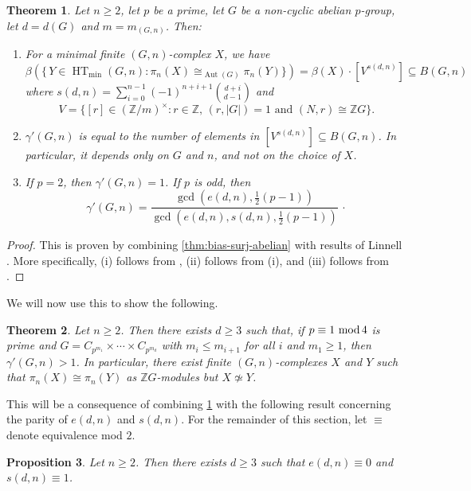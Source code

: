 \documentclass[11pt,a4paper,leqno]{amsart}
\newtheorem{theorem}{Theorem}[section]
\newtheorem{proposition}[theorem]{Proposition}
\theoremstyle{definition}
\theoremstyle{remark}
\newenvironment{clist}[1]
{\begin{enumerate}[\normalfont #1]}
{\end{enumerate}}
\newcommand{\Z}{\mathbb{Z}}
\renewcommand{\mod}{\,\,\text{\normalfont mod}\,}
\DeclareMathOperator{\Aut}{Aut}
\DeclareMathOperator{\HT}{HT}
\begin{document}
\begin{theorem} \label{thm:gamma'}
Let $n \ge 2$, let $p$ be a prime, let $G$ be a non-cyclic abelian $p$-group, let $d = d(G)$ and $m = m_{(G,n)}$. Then:
\begin{clist}{(i)}
\item
 For a minimal finite $(G,n)$-complex $X$, we have
\[ \beta(\{\, Y \in \HT_{\min}(G,n) : \pi_n(X) \cong_{\Aut(G)} \pi_n(Y)\}) = \beta(X) \cdot [V^{s(d,n)}] \subseteq B(G,n) \]
where $s(d,n) = \sum_{i=0}^{n-1} (-1)^{n+i+1}\binom{d+i}{d-1}$ and
\[ V = \{ [r] \in (\Z/m)^\times : r \in \Z, \, (r,|G|)=1 \text{ and } (N,r) \cong \Z G \}. \]
\item
$\gamma'(G,n)$ is equal to the number of elements in $[V^{s(d,n)}] \subseteq B(G,n)$. In particular, it depends only on $G$ and $n$, and not on the choice of $X$.
\item If $p =2$, then $\gamma'(G,n) = 1$. If $p$ is odd, then
\[ 
\gamma'(G,n) = \frac{\gcd(e(d,n),\frac{1}{2}(p-1))}{\gcd(e(d,n),s(d,n),\frac{1}{2}(p-1))} \,\cdot
\]
\end{clist}
\end{theorem}

\begin{proof}
This is proven by combining \cref{thm:bias-surj-abelian} with results of Linnell \cite{Linnell:1993}. More specifically, (i) follows from \cite[Theorem 8.4 (iii)]{Linnell:1993}, (ii) follows from (i), and (iii) follows from \cite[Theorems 1.2 (4)]{Linnell:1993}.
\end{proof}

We will now use this to show the following.

\begin{theorem} \label{thm:e-s-ex}
Let $n \ge 2$. Then there exists $d \ge 3$ such that, if $p \equiv 1 \mod 4$ is prime and $G = C_{p^{m_1}} \times \cdots \times C_{p^{m_d}}$ with $m_i \le m_{i+1}$ for all $i$ and $m_1 \ge 1$, then $\gamma'(G,n) > 1$.	 
In particular, there exist finite $(G,n)$-complexes $X$ and $Y$ such that $\pi_n(X) \cong \pi_n(Y)$ as $\Z G$-modules but $X \not \simeq Y$.
\end{theorem}

This will be a consequence of combining \cref{thm:gamma'} with the following result concerning the parity of $e(d,n)$ and $s(d,n)$. 
 For the remainder of this section, let $\equiv$ denote equivalence mod $2$.

\begin{proposition} \label{prop:e-s-parity}
Let $n \ge 2$. Then there exists $d \ge 3$ such that $e(d,n) \equiv 0$ and $s(d,n) \equiv 1$.
\end{proposition}
\end{document}
